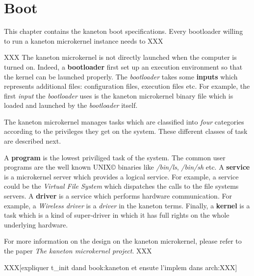 %
%
%
%
%
%

%
%

\chapter{Boot}
\label{chapter:label}

This chapter contains the kaneton boot specifications. Every bootloader
willing to run a kaneton microkernel instance needs to XXX

\newpage

%
%

XXX
The kaneton microkernel is not directly launched when the computer is
turned on. Indeed, a \textbf{bootloader} first set up an execution environment
so that the kernel can be launched properly. The \textit{bootloader} takes
some \textbf{inputs} which represents additional files: configuration
files, execution files etc. For example, the first \textit{input} the
\textit{bootloader} uses is the kaneton microkernel binary file which is
loaded and launched by the \textit{bootloader} itself.

The kaneton microkernel manages tasks which are classified into \textit{four}
categories according to the privileges they get on the system. These different
classes of task are described next.

A \textbf{program} is the lowest priviliged task of the system. The common
user programs are the well known UNIX{\copyright} binaries like
\textit{/bin/ls}, \textit{/bin/sh} etc. A \textbf{service} is a microkernel
server which provides a logical service. For example, a service could be the
\textit{Virtual File System} which dispatches the calls to the file systems
servers. A \textbf{driver} is a service which performs hardware communication.
For example, a \textit{Wireless driver} is a \textit{driver} in the kaneton
terms. Finally, a \textbf{kernel} is a task which is a kind of super-driver
in which it has full rights on the whole underlying hardware.

For more information on the design on the kaneton microkernel, please
refer to the paper \textit{The kaneton microkernel project}.
XXX

XXX[expliquer t\_init dand book:kaneton et ensute l'implem dans arch:XXX]
